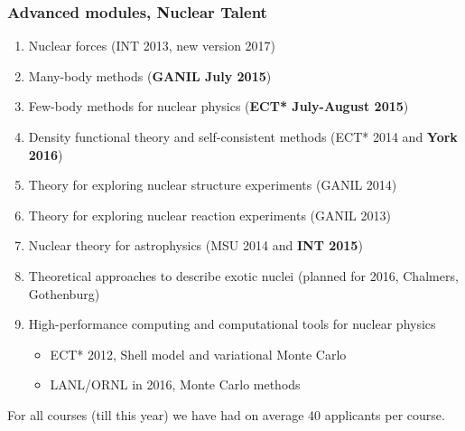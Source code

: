 \documentclass{beamer}
\begin{document}
\begin{frame}
\frametitle{Advanced  modules, Nuclear Talent}

\begin{block}{}
\begin{enumerate}
\item Nuclear forces (INT 2013, new version 2017)

\item Many-body methods (\textbf{GANIL July 2015})

\item Few-body methods for nuclear physics (\textbf{ECT* July-August 2015})

\item Density functional theory and self-consistent methods (ECT* 2014 and \textbf{York 2016})

\item Theory for exploring nuclear structure experiments (GANIL 2014)

\item Theory for exploring nuclear reaction experiments (GANIL 2013)

\item Nuclear theory for astrophysics (MSU 2014 and \textbf{INT 2015})

\item Theoretical approaches to describe  exotic nuclei (planned for 2016, Chalmers, Gothenburg)

\item High-performance computing and computational tools for nuclear physics
\begin{itemize}

  \item ECT* 2012, Shell model and variational Monte Carlo

  \item LANL/ORNL in 2016, Monte Carlo methods 
\end{itemize}

\noindent
\end{enumerate}

\noindent
For all courses (till this year) we have had on average 40 applicants per course.

\end{block}
\end{frame}
\end{document}
